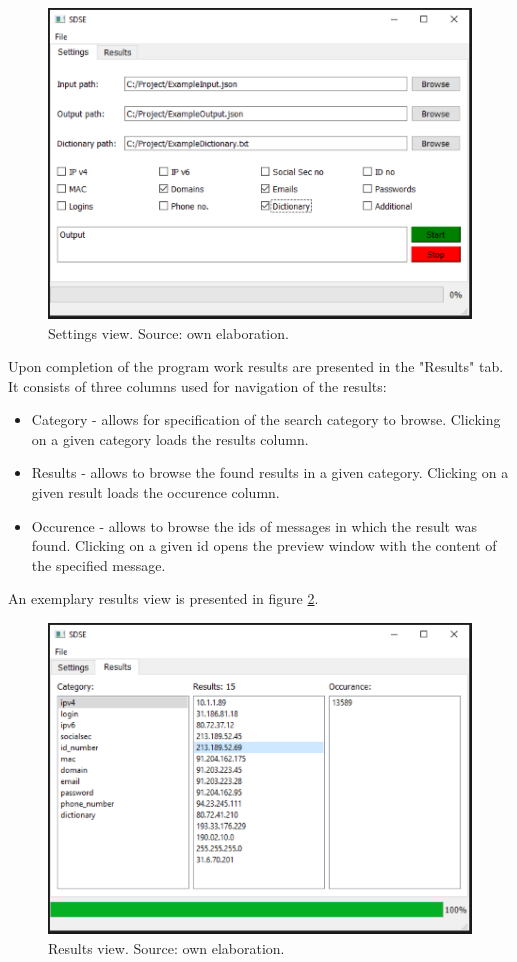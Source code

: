 \documentclass[a4paper,twoside,12pt]{book}
\begin{document}
\begin{figure}
\centering
\includegraphics{Images/SettingsTab}
\caption{Settings view. Source: own elaboration.}
\label{fig:SettingsTab}
\end{figure}

Upon completion of the program work results are presented in the "Results" tab. It consists of three columns used for
navigation of the results: 
\begin{itemize}
   \item Category - allows for specification of the search category to browse. Clicking on a given category loads
   the results column.
   \item Results - allows to browse the found results in a given category. Clicking on a given result loads the 
   occurence column.
   \item Occurence - allows to browse the ids of messages in which the result was found. Clicking on a given id
   opens the preview window with the content of the specified message.
\end{itemize}

An exemplary results view is presented in figure \ref{fig:ResultsTab}.

\begin{figure}
\centering
\includegraphics{Images/ResultsTab}
\caption{Results view. Source: own elaboration.}
\label{fig:ResultsTab}
\end{figure}
\end{document}
